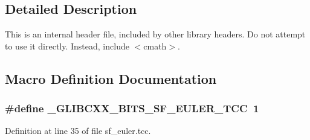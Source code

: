 \subsection{Detailed Description}
This is an internal header file, included by other library headers. Do not attempt to use it directly. Instead, include $<$cmath$>$. 

\subsection{Macro Definition Documentation}
\subsubsection[{\texorpdfstring{\+\_\+\+G\+L\+I\+B\+C\+X\+X\+\_\+\+B\+I\+T\+S\+\_\+\+S\+F\+\_\+\+E\+U\+L\+E\+R\+\_\+\+T\+CC}{_GLIBCXX_BITS_SF_EULER_TCC}}]{\setlength{\rightskip}{0pt plus 5cm}\#define \+\_\+\+G\+L\+I\+B\+C\+X\+X\+\_\+\+B\+I\+T\+S\+\_\+\+S\+F\+\_\+\+E\+U\+L\+E\+R\+\_\+\+T\+CC~1}\hypertarget{sf__euler_8tcc_a210115accb5094cbfd706ac2e4288414}{}\label{sf__euler_8tcc_a210115accb5094cbfd706ac2e4288414}


Definition at line 35 of file sf\+\_\+euler.\+tcc.

